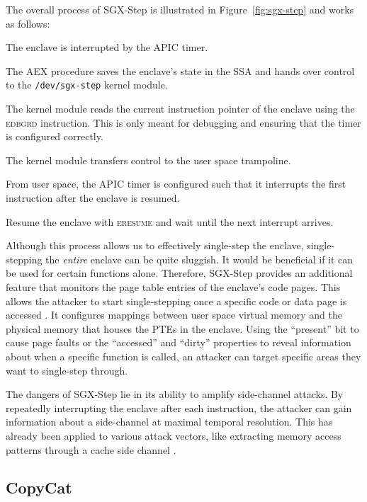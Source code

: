 \documentclass{llncs}
\begin{document}
The overall process of SGX-Step is illustrated in Figure~\ref{fig:sgx-step} and
works as follows:
\begin{enumerate*}
  \item[\ding{172}]
    The enclave is interrupted by the APIC timer.
  \item[\ding{173}]
    The AEX procedure saves the enclave's state in the SSA and hands over
    control to the \texttt{/dev/sgx-step} kernel module.
  \item[\ding{174}]
    The kernel module reads the current instruction pointer of the enclave
    using the \textsc{edbgrd} instruction.
    This is only meant for debugging and ensuring that the timer is configured
    correctly.
  \item[\ding{175}]
    The kernel module transfers control to the user space trampoline.
  \item[\ding{176}]
    From user space, the APIC timer is configured such that it interrupts the
    first instruction after the enclave is resumed.
  \item[\ding{177}]
    Resume the enclave with \textsc{eresume} and
    wait until the next interrupt arrives.
\end{enumerate*}

Although this process allows us to effectively single-step the enclave,
single-stepping the \emph{entire} enclave can be quite sluggish.
It would be beneficial if it can be used for certain functions alone.
Therefore, SGX-Step provides an additional feature that monitors the page table
entries of the enclave's code pages.
This allows the attacker to start single-stepping once a specific code or
data page is accessed \cite{BulckWKPS17}.
It configures mappings between user space virtual memory and the physical
memory that houses the PTEs in the enclave.
Using the ``present'' bit to cause page faults \cite{XuCP15} or the
``accessed'' and ``dirty'' properties to reveal information about when a
specific function is called, an attacker can target specific areas they want to
single-step through.

The dangers of SGX-Step lie in its ability to amplify side-channel attacks.
By repeatedly interrupting the enclave after each instruction, the attacker can
gain information about a side-channel at maximal temporal resolution.
This has already been applied to various attack vectors, like extracting memory
access patterns through a cache side channel \cite{HahnelCP17}.

\subsection{CopyCat}
\end{document}
